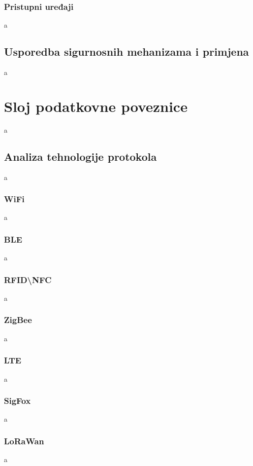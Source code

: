 \documentclass[times, utf8, diplomski]{fer}
\begin{document}
\subsubsection{Pristupni uređaji}
a

\subsection{Usporedba sigurnosnih mehanizama i primjena}
a

\section{Sloj podatkovne poveznice}
a

\subsection{Analiza tehnologije protokola}%
a

\subsubsection{WiFi}
a

\subsubsection{BLE}
a

\subsubsection{RFID\textbackslash NFC}
a

\subsubsection{ZigBee}
a

\subsubsection{LTE}
a

\subsubsection{SigFox}
a

\subsubsection{LoRaWan}
a
\end{document}
